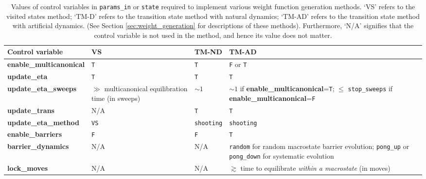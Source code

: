 \documentclass{report}
\begin{document}
\begin{landscape}
\begin{table}\label{table:wf_gen_variables}
\begin{center}
\begin{tabular}{l p{4cm} p{2cm} p{6cm}}
Control variable                   & VS                & TM-ND                & TM-AD \\
\hline 
\textbf{enable\_multicanonical}    & \texttt{T}        &   \texttt{T}         &  \texttt{F} or \texttt{T}   \\
\textbf{update\_eta}               & \texttt{T}        &   \texttt{T}         &  \texttt{T}                 \\
\textbf{update\_eta\_sweeps}       & $\gg$ multicanonical equilibration time (in sweeps)  & $\sim 1$ &   $\sim 1$ if \textbf{enable\_multicanonical}=\texttt{T}; 
   $\leq$ \texttt{stop\_sweeps} if \textbf{enable\_multicanonical}=\texttt{F} \\
\textbf{update\_trans}             & N/A               &   \texttt{T}         &  \texttt{T}                 \\
\textbf{update\_eta\_method}       & \texttt{VS}       &   \texttt{shooting}  &  \texttt{shooting}     \\
\textbf{enable\_barriers}          & \texttt{F}        &   \texttt{F}         &  \texttt{T}                 \\
\textbf{barrier\_dynamics}         & N/A               &   N/A                &  \texttt{random} for random macrostate barrier evolution;
    \texttt{pong\_up} or \texttt{pong\_down} for systematic evolution  \\
\textbf{lock\_moves}               & N/A               &   N/A                &  $\gtrsim$ time to equilibrate \emph{within a macrostate} (in moves) \\
\end{tabular}
\end{center}
\caption{Values of control variables in \texttt{params\_in} or \texttt{state} required to implement various weight function generation methods.
`VS' refers to the visited states method; `TM-D' refers to the transition state method with natural dynamics; `TM-AD' refers to the
transition state method with artificial dynamics. (See Section 
\ref{sec:weight_generation} for descriptions of these methods). Furthermore, `N/A' signifies that the control variable is not used in the
method, and hence its value does not matter.}
\end{table}
\end{landscape}
\end{document}
